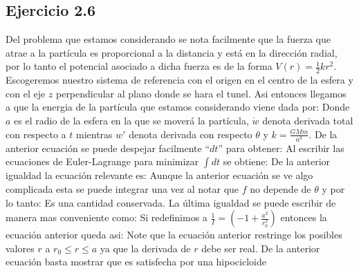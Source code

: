 \subsection*{Ejercicio 2.6}
Del problema que estamos considerando se nota facilmente que la fuerza que atrae a la part\'icula es proporcional a la distancia y est\'a en la direcci\'on radial, por lo tanto el potencial asociado a dicha fuerza es de la forma $V(r)=\frac{1}{2} k r^2$. Escogeremos nuestro sistema de referencia con el origen en el centro de la esfera y con el eje $z$ perpendicular al plano donde se hara el tunel. Asi entonces llegamos a que la energia de la part\'icula que estamos considerando viene dada por:
Donde $a$ es el radio de la esfera en la que se mover\'a la part\'icula, $\dot w$ denota derivada total con respecto a $t$ mientras $w'$ denota derivada con respecto $\theta$ y $k=\frac{G M m}{a^3}$. De la anterior ecuaci\'on se puede despejar facilmente ``$dt$'' para obtener:
Al escribir las ecuaciones de Euler-Lagrange para minimizar $\int dt$ se obtiene:
De la anterior igualdad la ecuaci\'on relevante es:
Aunque la anterior ecuaci\'on se ve algo complicada esta se puede integrar una vez al notar que $f$ no depende de $\theta$ y por lo tanto:
Es una cantidad conservada. La \'ultima igualdad se puede escribir de manera mas conveniente como:
Si redefinimos a $\frac{1}{I}=\left(-1+\frac{a^2}{r_0^2} \right)$ entonces la ecuaci\'on anterior queda asi:
Note que la ecuaci\'on anterior restringe los posibles valores $r$ a $r_0\leq r \leq a$ ya que la derivada de $r$ debe ser real.
De la anterior ecuaci\'on basta mostrar que es satisfecha por una hipocicloide


